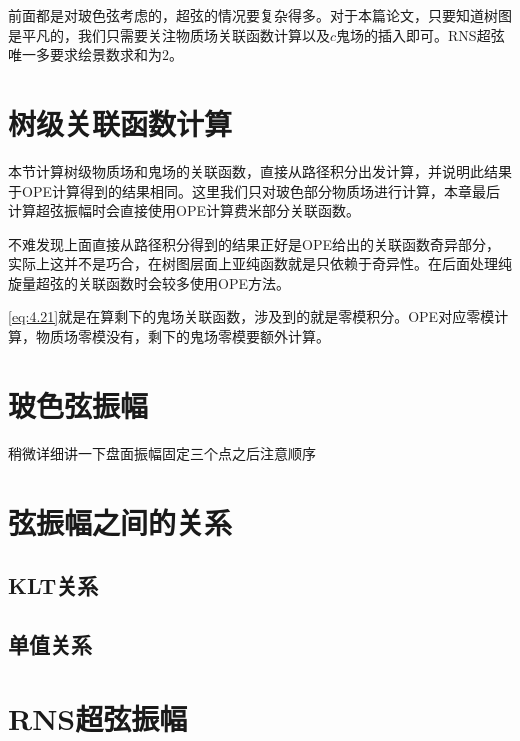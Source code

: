 前面都是对玻色弦考虑的，超弦的情况要复杂得多。对于本篇论文，只要知道树图是平凡的，我们只需要关注物质场关联函数计算以及$c$鬼场的插入即可。RNS超弦唯一多要求绘景数求和为$2$。
\section{树级关联函数计算}
本节计算树级物质场和鬼场的关联函数，直接从路径积分出发计算，并说明此结果于OPE计算得到的结果相同。这里我们只对玻色部分物质场进行计算，本章最后计算超弦振幅时会直接使用OPE计算费米部分关联函数。



不难发现上面直接从路径积分得到的结果正好是OPE给出的关联函数奇异部分，实际上这并不是巧合，在树图层面上亚纯函数就是只依赖于奇异性。在后面处理纯旋量超弦的关联函数时会较多使用OPE方法。

\ref{eq:4.21}就是在算剩下的鬼场关联函数，涉及到的就是零模积分。OPE对应零模计算，物质场零模没有，剩下的鬼场零模要额外计算。
\section{玻色弦振幅}
稍微详细讲一下盘面振幅固定三个点之后注意顺序
\section{弦振幅之间的关系}
\subsection{KLT关系}
\subsection{单值关系}

\section{RNS超弦振幅}
